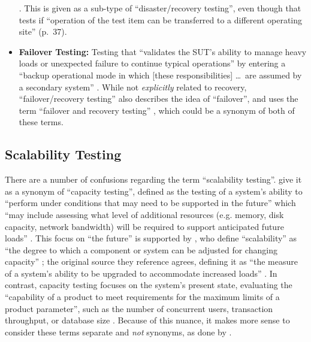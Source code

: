 \begin{itemize}
            \citep[p.~37]{IEEE2021}. This is given as a sub-type of
            ``disaster/recovery testing'', even though that tests if ``operation
            of the test item can be transferred to a different operating site''
            (p.~37).
      \item \textbf{Failover Testing:} Testing that ``validates the SUT's
            ability to manage heavy loads or unexpected failure to continue
            typical operations'' \citep[p.~5-9]{SWEBOK2024} by entering a
            ``backup operational mode in which [these responsibilities] \dots\
            are assumed by a secondary system'' \citepISTQB{}. While not
            \emph{explicitly} related to recovery, ``failover/recovery testing''
            also describes the idea of ``failover'', and \citeauthor{Firesmith2015}
            uses the term ``failover and recovery testing''
            \citeyearpar[p.~56]{Firesmith2015}, which could be a synonym of
            both of these terms.
\end{itemize}

\subsection{Scalability Testing}
\label{scal-discrep}

There are a number of confusions regarding the term ``scalability testing''.
\citeauthor{IEEE2021} give it as a synonym of ``capacity testing'', defined
as the testing of a system's ability to ``perform under conditions that may
need to be supported in the future'' which ``may include assessing what level
of additional resources (e.g. memory, disk capacity, network bandwidth) will
be required to support anticipated future loads'' \citeyearpar[p.~39]{IEEE2021}.
This focus on ``the future'' is supported by \citeauthor{ISTQB_author},
who define ``scalability'' as ``the degree to which a component or system can be
adjusted for changing capacity'' \citeyearpar{ISTQB}; the original source
they reference agrees, defining it as ``the measure of a system's ability to be
upgraded to accommodate increased loads'' \citep[p.~381]{GerrardAndThompson2002}.
In contrast, capacity testing focuses on the system's present state, evaluating
the ``capability of a product to meet requirements for the maximum limits of a
product parameter'', such as the number of concurrent users, transaction
throughput, or database size \citep{ISO_IEC2023a}. Because of this nuance, it
makes more sense to consider these terms separate and \emph{not} synonyms, as
done by \citet[pp.~22-23]{Bas2024}.

